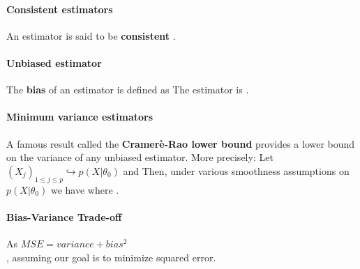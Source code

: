 \paragraph{Consistent estimators}
An estimator is said to be \textbf{consistent} . 

\paragraph{Unbiased estimator}
The \textbf{bias} of an estimator is defined as 
The estimator is .

\paragraph{Minimum variance estimators}
A famous result called the \textbf{Cramerè-Rao lower bound} provides a lower bound on the
variance of any unbiased estimator. More precisely:
Let $\left(X_{j}\right)_{1 \leq j \leq p} \hookrightarrow p(X|\theta_{0})$ and 
Then, under various smoothness assumptions on $p(X|\theta_{0})$ we have  
where .

\paragraph{Bias-Variance Trade-off} 
As $MSE = variance + bias^{2}$\\
,
assuming our goal is to minimize squared error. 
